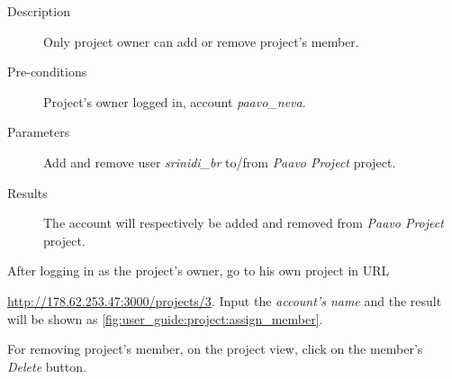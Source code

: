 \begin{description}
\item[Description] Only project owner can add or remove project's member.
\item[Pre-conditions] Project's owner logged in, \eg account \emph{paavo\_neva}.
\item[Parameters] Add and remove user \emph{srinidi\_br} to/from \emph{Paavo Project} project.
\item[Results] The account will respectively be added and removed from \emph{Paavo Project} project.
\end{description}

After logging in as the project's owner, go to his own project in URL 

\noindent\href{http://178.62.253.47:3000/projects/3}{http://178.62.253.47:3000/projects/3}.
Input the \emph{account's name} and the result will be shown as \autoref{fig:user_guide:project:assign_member}.

For removing project's member, on the project view, click on the member's \emph{Delete} button.

